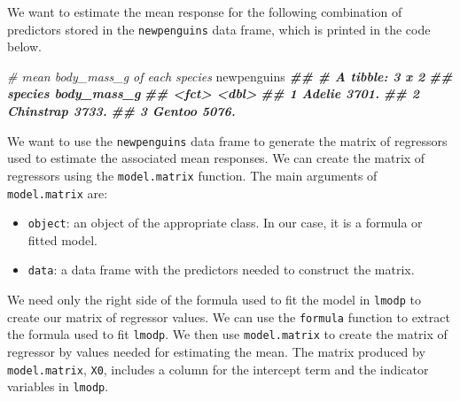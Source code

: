 \documentclass[
]{book}
\newenvironment{Shaded}{\begin{snugshade}}{\end{snugshade}}
\newcommand{\CommentTok}[1]{\textcolor[rgb]{0.56,0.35,0.01}{\textit{#1}}}
\newcommand{\DocumentationTok}[1]{\textcolor[rgb]{0.56,0.35,0.01}{\textbf{\textit{#1}}}}
\newcommand{\NormalTok}[1]{#1}
\providecommand{\tightlist}{%
  \setlength{\itemsep}{0pt}\setlength{\parskip}{0pt}}
\theoremstyle{definition}
\theoremstyle{definition}
\theoremstyle{definition}
\theoremstyle{definition}
\theoremstyle{remark}
\begin{document}
We want to estimate the mean response for the following combination of predictors stored in the \texttt{newpenguins} data frame, which is printed in the code below.

\begin{Shaded}
\begin{Highlighting}[]
\CommentTok{\# mean body\_mass\_g of each species}
\NormalTok{newpenguins}
\DocumentationTok{\#\# \# A tibble: 3 x 2}
\DocumentationTok{\#\#   species   body\_mass\_g}
\DocumentationTok{\#\#   \textless{}fct\textgreater{}           \textless{}dbl\textgreater{}}
\DocumentationTok{\#\# 1 Adelie          3701.}
\DocumentationTok{\#\# 2 Chinstrap       3733.}
\DocumentationTok{\#\# 3 Gentoo          5076.}
\end{Highlighting}
\end{Shaded}

We want to use the \texttt{newpenguins} data frame to generate the matrix of regressors used to estimate the associated mean responses. We can create the matrix of regressors using the \texttt{model.matrix} function. The main arguments of \texttt{model.matrix} are:

\begin{itemize}
\tightlist
\item
  \texttt{object}: an object of the appropriate class. In our case, it is a formula or fitted model.
\item
  \texttt{data}: a data frame with the predictors needed to construct the matrix.
\end{itemize}

We need only the right side of the formula used to fit the model in \texttt{lmodp} to create our matrix of regressor values. We can use the \texttt{formula} function to extract the formula used to fit \texttt{lmodp}. We then use \texttt{model.matrix} to create the matrix of regressor by values needed for estimating the mean. The matrix produced by \texttt{model.matrix}, \texttt{X0}, includes a column for the intercept term and the indicator variables in \texttt{lmodp}.
\end{document}
